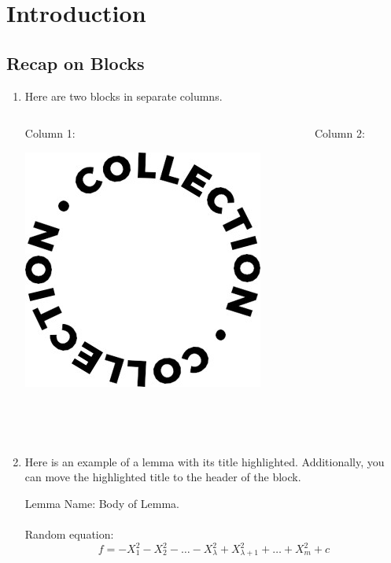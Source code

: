\section{Introduction}
\subsection{Recap on Blocks}
\begin{frame}
\begin{enumerate}
    \item Here are two blocks in separate columns.
    \hfill
    \begin{columns}
    \begin{column}{0.48\textwidth}
    \begin{block}{Column 1:}
    \begin{center}
        \includegraphics[width=0.5\linewidth]{Logos and Figures/copilka.jpg}
    \end{center}
\\~\
    \end{block}
    \end{column}
    \begin{column}{0.48\textwidth}
    \begin{block}{Column 2:}
    \lipsum[1][1-6]
\\~\
    \end{block}
    \end{column}
    \end{columns}
\end{enumerate}
\end{frame}

\begin{frame}
\begin{enumerate}
        \setcounter{enumi}{1}
        \item Here is an example of a lemma with its title highlighted. Additionally, you can move the highlighted title to the header of the block.
        \\
\begin{Lemma}
    \alert{Lemma Name:} Body of Lemma.\\~\ 
    \\ Random equation:
    \[ f = -X_1^2-X_2^2-\dots-X_\lambda^2+X_{\lambda+1}^2+\dots+X_m^2+c\]
    \\~\
\end{Lemma}
\end{enumerate}
\end{frame}



